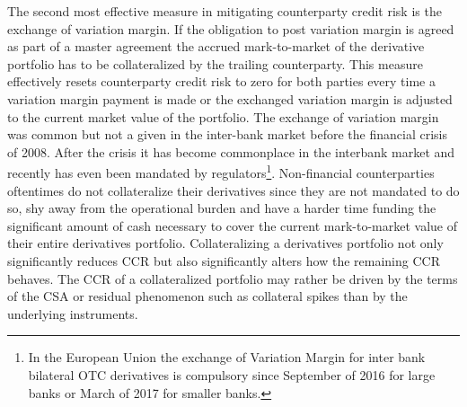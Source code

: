 \documentclass[../Thesis_AHoecherl.tex]{subfiles}
\begin{document}
The second most effective measure in mitigating counterparty credit risk is the exchange of variation margin. If the obligation to post variation margin is agreed as part of a master agreement the accrued mark-to-market of the derivative portfolio has to be collateralized by the trailing counterparty. This measure effectively resets counterparty credit risk to zero for both parties every time a variation margin payment is made or the exchanged variation margin is adjusted to the current market value of the portfolio. The exchange of variation margin was common but not a given in the inter-bank market before the financial crisis of 2008. After the crisis it has become commonplace in the interbank market and recently has even been mandated by regulators\footnote{In the European Union the exchange of Variation Margin for inter bank bilateral OTC derivatives is compulsory since September of 2016 for large banks or March of 2017 for smaller banks.}. Non-financial counterparties oftentimes do not collateralize their derivatives since they are not mandated to do so, shy away from the operational burden and have a harder time funding the significant amount of cash necessary to cover the current mark-to-market value of their entire derivatives portfolio. Collateralizing a derivatives portfolio not only significantly reduces \gls{CCR} but also significantly alters how the remaining \gls{CCR} behaves. The \gls{CCR} of a collateralized portfolio may rather be driven by the terms of the \gls{CSA} or residual phenomenon such as collateral spikes than by the underlying instruments.
\end{document}
